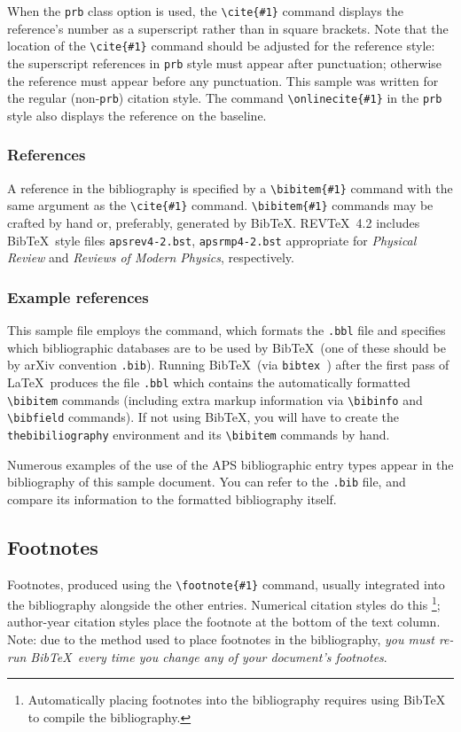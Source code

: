 \documentclass[%
 preprint, linenumbers,
 amsmath,amssymb,
 aps, physrev,
]{revtex4-2}
\begin{document}
When the \verb+prb+ class option is used, the \verb+\cite{#1}+ command
displays the reference's number as a superscript rather than in
square brackets. Note that the location of the \verb+\cite{#1}+
command should be adjusted for the reference style: the superscript
references in \verb+prb+ style must appear after punctuation;
otherwise the reference must appear before any punctuation. This
sample was written for the regular (non-\texttt{prb}) citation style.
The command \verb+\onlinecite{#1}+ in the \texttt{prb} style also
displays the reference on the baseline.

\subsubsection{References}
A reference in the bibliography is specified by a \verb+\bibitem{#1}+ command
with the same argument as the \verb+\cite{#1}+ command.
\verb+\bibitem{#1}+ commands may be crafted by hand or, preferably,
generated by Bib\TeX. 
REV\TeX~4.2 includes Bib\TeX\ style files
\verb+apsrev4-2.bst+, \verb+apsrmp4-2.bst+ appropriate for
\textit{Physical Review} and \textit{Reviews of Modern Physics},
respectively.

\subsubsection{Example references}
This sample file employs the \verb++ command, 
which formats the \texttt{\jobname .bbl} file
and specifies which bibliographic databases are to be used by Bib\TeX\ 
(one of these should be by arXiv convention \texttt{\jobname .bib}).
Running Bib\TeX\ (via \texttt{bibtex \jobname}) 
after the first pass of \LaTeX\ produces the file
\texttt{\jobname .bbl} which contains the automatically formatted
\verb+\bibitem+ commands (including extra markup information via
\verb+\bibinfo+ and \verb+\bibfield+ commands). 
If not using Bib\TeX, you will have to create the \verb+thebibiliography+ environment 
and its \verb+\bibitem+ commands by hand.

Numerous examples of the use of the APS bibliographic entry types appear in the bibliography of this sample document.
You can refer to the \texttt{\jobname .bib} file, 
and compare its information to the formatted bibliography itself.

\subsection{Footnotes}%
Footnotes, produced using the \verb+\footnote{#1}+ command, 
usually integrated into the bibliography alongside the other entries.
Numerical citation styles do this%
\footnote{Automatically placing footnotes into the bibliography requires using BibTeX to compile the bibliography.};
author-year citation styles place the footnote at the bottom of the text column.
Note: due to the method used to place footnotes in the bibliography, 
\emph{you must re-run Bib\TeX\ every time you change any of your document's footnotes}. 
\end{document}
